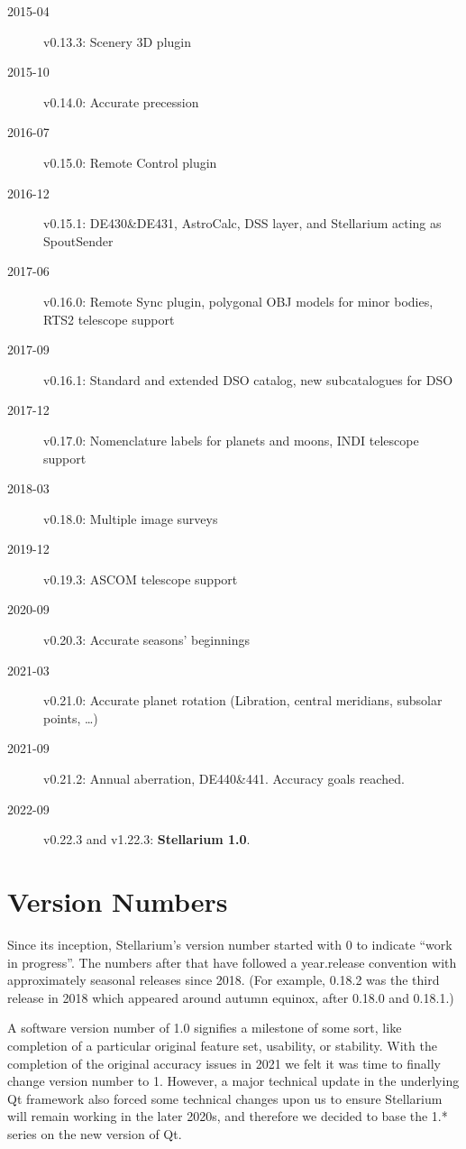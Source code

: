 \begin{description}
\item[2015-04] v0.13.3: Scenery 3D plugin
\item[2015-10] v0.14.0: Accurate precession
\item[2016-07] v0.15.0: Remote Control plugin
\item[2016-12] v0.15.1: DE430\&DE431, AstroCalc, DSS layer, and Stellarium acting as SpoutSender
\item[2017-06] v0.16.0: Remote Sync plugin, polygonal OBJ models for minor bodies, RTS2 telescope support
\item[2017-09] v0.16.1: Standard and extended DSO catalog, new subcatalogues for DSO
\item[2017-12] v0.17.0: Nomenclature labels for planets and moons, INDI telescope support
\item[2018-03] v0.18.0: Multiple image surveys
\item[2019-12] v0.19.3: ASCOM telescope support 
\item[2020-09] v0.20.3: Accurate seasons' beginnings
\item[2021-03] v0.21.0: Accurate planet rotation (Libration, central meridians, subsolar points, \ldots) 
\item[2021-09] v0.21.2: Annual aberration, DE440\&441. Accuracy goals reached.
\item[2022-09] v0.22.3 and v1.22.3: \textbf{Stellarium 1.0}.  
\end{description}

\section{Version Numbers}
Since its inception, Stellarium's version number started with 0 to
indicate ``work in progress''. The numbers after that have followed a
year.release convention with approximately seasonal releases since
2018. (For example, 0.18.2 was the third release in 2018 which
appeared around autumn equinox, after 0.18.0 and 0.18.1.)

A software version number of 1.0 signifies a milestone of some sort,
like completion of a particular original feature set, usability, or
stability. With the completion of the original accuracy issues in 2021
we felt it was time to finally change version number to 1. However, a
major technical update in the underlying Qt framework also forced some
technical changes upon us to ensure Stellarium will remain working in
the later 2020s, and therefore we decided to base the 1.* series on
the new version of Qt.

